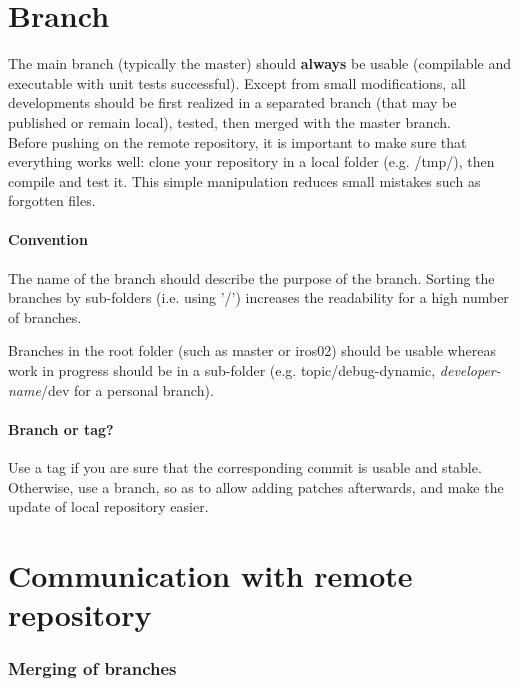 \section{Branch}
The main branch (typically the master) should \textbf{always} be usable (compilable and executable with unit tests successful).
Except from small modifications, all developments should be first realized in a separated branch (that may be published or remain local), tested, then merged with the master branch.\\

Before pushing on the remote repository, it is important to make sure that everything works well: 
clone your repository in a local folder (e.g. /tmp/), then compile and test it.
This simple manipulation reduces small mistakes such as forgotten files.

\paragraph{Convention}
The name of the branch should describe the purpose of the branch.
Sorting the branches by sub-folders (i.e. using '/') increases the readability for a high number of branches.

Branches in the root folder (such as master or iros02) should be usable whereas 
work in progress should be in a sub-folder (e.g. topic/debug-dynamic, \textit{developer-name}/dev for a personal branch).

\paragraph{Branch or tag?}

Use a tag if you are sure that the corresponding commit is usable and stable.
Otherwise, use a branch, so as to allow adding patches afterwards, and make the update of local repository easier.


\section{Communication with remote repository}

\subsubsection{Merging of branches}

